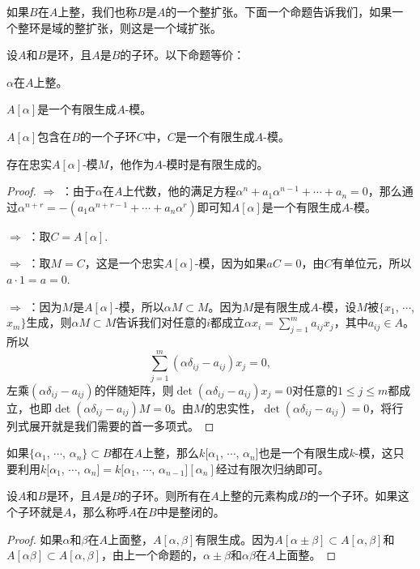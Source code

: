 如果$B$在$A$上整，我们也称$B$是$A$的一个整扩张。下面一个命题告诉我们，如果一个整环是域的整扩张，则这是一个域扩张。

\begin{pro}\label{p2:1}
	设$A$和$B$是环，且$A$是$B$的子环。以下命题等价：
	\begin{compactenum}[~~~(1)]
		\item $\alpha$在$A$上整。
		\item $A[\alpha]$是一个有限生成$A$-模。
		\item $A[\alpha]$包含在$B$的一个子环$C$中，$C$是一个有限生成$A$-模。
		\item 存在忠实$A[\alpha]$-模$M$，他作为$A$-模时是有限生成的。
	\end{compactenum}
\end{pro}	

\begin{proof} 
	 $\Rightarrow$  ：由于$\alpha$在$A$上代数，他的满足方程$\alpha^n+a_1\alpha^{n-1}+\cdots+a_n=0$，那么通过$\alpha^{n+r}=-(a_1\alpha^{n+r-1}+\cdots+a_n\alpha^r)$即可知$A[\alpha]$是一个有限生成$A$-模。

	 $\Rightarrow$  ：取$C=A[\alpha]$.

	 $\Rightarrow$  ：取$M=C$，这是一个忠实$A[\alpha]$-模，因为如果$aC=0$，由$C$有单位元，所以$a\cdot 1=a=0$.

	 $\Rightarrow$  ：因为$M$是$A[\alpha]$-模，所以$\alpha M\subset M$。因为$M$是有限生成$A$-模，设$M$被$\{x_1$, $\cdots$, $x_m\}$生成，则$\alpha M\subset M$告诉我们对任意的$i$都成立$\alpha x_i=\sum_{j=1}^m a_{ij} x_j$，其中$a_{ij}\in A$。所以
	\[
		\sum_{j=1}^m (\alpha\delta_{ij} -a_{ij})x_j=0,
	\]
	左乘$(\alpha\delta_{ij} -a_{ij})$的伴随矩阵，则$\det(\alpha\delta_{ij} -a_{ij})x_j=0$对任意的$1\leq j \leq m$都成立，也即$\det(\alpha\delta_{ij} -a_{ij})M=0$。由$M$的忠实性，$\det(\alpha\delta_{ij} -a_{ij})=0$，将行列式展开就是我们需要的首一多项式。
\end{proof}

如果$\{\alpha_1$, $\cdots$, $\alpha_n\}\subset B$都在$A$上整，那么$k[\alpha_1$, $\cdots$, $\alpha_n]$也是一个有限生成$k$-模，这只要利用$k[\alpha_1$, $\cdots$, $\alpha_n]=k[\alpha_1$, $\cdots$, $\alpha_{n-1}][\alpha_n]$经过有限次归纳即可。

\para \label{iope}设$A$和$B$是环，且$A$是$B$的子环。则所有在$A$上整的元素构成$B$的一个子环。如果这个子环就是$A$，那么称呼$A$在$B$中是整闭的。

\begin{proof} 如果$\alpha$和$\beta$在$A$上面整，$A[\alpha,\beta]$有限生成。因为$A[\alpha\pm\beta]\subset A[\alpha,\beta]$和$A[\alpha\beta]\subset A[\alpha,\beta]$，由上一个命题的，$\alpha\pm\beta$和$\alpha\beta$在$A$上面整。\end{proof}


